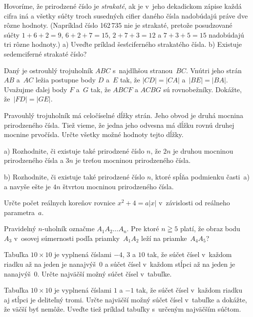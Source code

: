 {%
Hovoríme, že prirodzené číslo je {\it strakaté},
ak je v~jeho dekadickom zápise
každá cifra iná a všetky súčty troch susedných cifier daného čísla
nadobúdajú práve dve rôzne hodnoty. (Napríklad číslo 162\,735 nie je strakaté,
pretože posudzované súčty $1+6+2=9$, $6+2+7=15$, $2+7+3=12$ a $7+3+5=15$
nadobúdajú tri rôzne hodnoty.)
\ite a) Uveďte príklad šesťciferného strakatého čísla.
\ite b) Existuje sedemciferné strakaté číslo?
}

{%
Daný je ostrouhlý trojuholník $ABC$ s~najdlhšou stranou~$BC$.
Vnútri jeho strán $AB$ a~$AC$ ležia postupne body $D$ a~$E$ tak,
že $|CD|=|CA|$ a~$|BE|=|BA|$. Uvažujme ďalej body $F$ a~$G$ tak,
že $ABCF$ a $ACBG$ sú rovnobežníky. Dokážte, že~$|FD|=|GE|$.}

{%
Pravouhlý trojuholník má celočíselné dĺžky strán. Jeho obvod je druhá mocnina
prirodzeného čísla. Tiež vieme, že jedna jeho odvesna má dĺžku
rovnú druhej mocnine prvočísla. Určte všetky možné hodnoty tejto
dĺžky.}

{%
a) Rozhodnite, či existuje také prirodzené číslo $n$, že
$2n$ je druhou mocninou prirodzeného čísla a $3n$ je treťou mocninou
prirodzeného čísla.

b) Rozhodnite, či existuje také prirodzené číslo $n$,
ktoré spĺňa podmienku časti~a) a navyše ešte je $4n$
štvrtou mocninou prirodzeného čísla.}

{%
Určte počet reálnych koreňov rovnice $x^2+4=a|x|$
v~závislosti od reálneho parametra~$a$.}

{%
Pravidelný $n$-uholník označme $A_1A_2\dots A_n$.
Pre ktoré $n\geqq 5$ platí, že obraz bodu~$A_3$ v~osovej súmernosti
podľa priamky~$A_1A_2$ leží na priamke~$A_4A_5$?}

{%
Tabuľka $10\times 10$ je vyplnená číslami ${-4}$, $3$ a $10$ tak, že súčet čísel
v~každom riadku až na jeden je nanajvýš~0 a súčet čísel v~každom stĺpci až
na jeden je nanajvýš~0. Určte najväčší možný súčet čísel v~tabuľke.}

{%
Tabuľka $10\times10$ je vyplnená číslami $1$ a ${-1}$ tak, že súčet
čísel v~každom riadku aj stĺpci je deliteľný tromi. Určte
najväčší možný súčet čísel v~tabuľke a dokážte, že väčší byť
nemôže. Uveďte tiež príklad tabuľky s~určeným najväčším
súčtom.}

